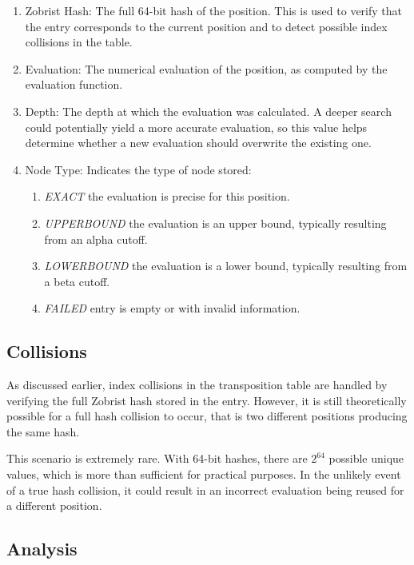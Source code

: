 \begin{enumerate}
  \item Zobrist Hash: The full 64-bit hash of the position. This is used to verify that the entry corresponds to the current position and to detect possible index collisions in the table.
  \item Evaluation: The numerical evaluation of the position, as computed by the evaluation function.
  \item Depth: The depth at which the evaluation was calculated. A deeper search could potentially yield a more accurate evaluation, so this value helps determine whether a new evaluation should overwrite the existing one.
  \item Node Type: Indicates the type of node stored:
  \begin{enumerate}
    \item \textit{EXACT} the evaluation is precise for this position.
    \item \textit{UPPERBOUND} the evaluation is an upper bound, typically resulting from an alpha cutoff.
    \item \textit{LOWERBOUND} the evaluation is a lower bound, typically resulting from a beta cutoff.
    \item \textit{FAILED} entry is empty or with invalid information.
  \end{enumerate}
\end{enumerate}

\subsection{Collisions}

As discussed earlier, index collisions in the transposition table are handled by verifying the full Zobrist hash stored in the entry. However, it is still theoretically possible for a full hash collision to occur, that is two different positions producing the same hash.

\vspace{1em}

\noindent This scenario is extremely rare. With 64-bit hashes, there are $2^{64}$ possible unique values, which is more than sufficient for practical purposes. In the unlikely event of a true hash collision, it could result in an incorrect evaluation being reused for a different position.

\subsection{Analysis}


